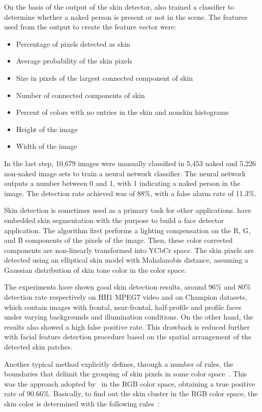 On the basis of the output of the skin detector, \citet{jones:02} also trained a classifier to determine whether a naked person is present or not in the scene. The features used from the output to create the feature vector were:
\begin{itemize}
    \item Percentage of pixels detected as skin
    \item Average probability of the skin pixels
    \item Size in pixels of the largest connected component of skin
    \item Number of connected components of skin
    \item Percent of colors with no entries in the skin and nonskin histograms
    \item Height of the image
    \item Width of the image
\end{itemize}

In the last step, 10,679 images were manually classified in 5,453 naked and 5,226 non-naked image sets to train a neural network classifier. The neural network outputs a number between 0 and 1, with 1 indicating a naked person in the image. The detection rate achieved was of 88\%, with a false alarm rate of 11.3\%.

Skin detection is sometimes used as a primary task for other applications. \citet{hsu:02} have embedded skin segmentation with the purpose to build a face detector application. The algorithm first performs a lighting compensation on the R, G, and B components of the pixels of the image. Then, these color corrected components are non-linearly transformed into YCbCr space. The skin pixels are detected using an elliptical skin model with Mahalanobis distance, assuming a Gaussian distribution of skin tone color in the color space.

The experiments have shown good skin detection results, around 96\% and 80\% detection rate respectively on HH1 MPEG7 video and on Champion datasets, which contain images with frontal, near-frontal, half-profile and profile faces under varying backgrounds and illumination conditions. On the other hand, the results also showed a high false positive rate. This drawback is reduced further with facial feature detection procedure based on the spatial arrangement of the detected skin patches.

Another typical method explicitly defines, through a number of rules, the boundaries that delimit the grouping of skin pixels in some color space~\citep{vezhnevets:03}. This was the approach adopted by~\citet{kovac:03} in the RGB color space, obtaining a true positive rate of 90.66\%. Basically, to find out the skin cluster in the RGB color space, the skin color is determined with the following rules~\citep{kovac:03}:


